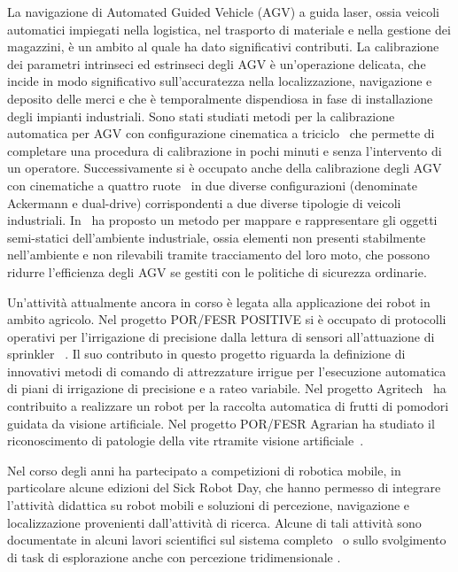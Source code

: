 \documentclass[11pt]{article}
\begin{document}
\begin{itemize}
La navigazione di Automated Guided Vehicle (AGV) a guida laser, ossia veicoli automatici impiegati nella logistica, nel trasporto di materiale
e nella gestione dei magazzini, \`e un ambito al quale ha dato significativi contributi. 
La calibrazione dei parametri intrinseci ed estrinseci degli AGV \`e un'operazione delicata, che incide in modo significativo sull'accuratezza nella localizzazione,  navigazione e deposito delle merci e che \`e temporalmente dispendiosa in fase di installazione degli impianti industriali. 
Sono stati studiati metodi per la calibrazione automatica per AGV con configurazione cinematica a triciclo~\cite{kallasi2017ras}
che permette di completare una procedura di calibrazione in pochi minuti e senza l'intervento di un operatore. 
Successivamente si \`e occupato anche della calibrazione degli AGV con cinematiche a quattro ruote~\cite{galasso2019rcim} in due diverse configurazioni (denominate Ackermann e dual-drive) corrispondenti a due diverse tipologie di veicoli industriali. 
In~\cite{lodirizzini2007icinco} ha proposto un metodo per mappare e rappresentare gli oggetti semi-statici dell'ambiente industriale, ossia elementi non presenti stabilmente 
nell'ambiente e non rilevabili tramite tracciamento del loro moto, che possono ridurre l'efficienza degli AGV se gestiti con le politiche di sicurezza ordinarie. 

Un'attivit\`a attualmente ancora in corso \`e legata alla applicazione dei robot in ambito agricolo.
Nel progetto POR/FESR POSITIVE si \`e occupato di protocolli operativi per l'irrigazione di precisione dalla lettura di sensori all'attuazione di sprinkler ~\cite{amoretti2020smartsys, penzotti2023compag}. 
Il suo contributo in questo progetto riguarda la definizione di innovativi metodi di comando di attrezzature irrigue per l'esecuzione automatica di piani di irrigazione di precisione e a rateo variabile. 
Nel progetto Agritech~\cite{monica2024etfa, saccuti2025irc} ha contribuito a realizzare un robot per la raccolta automatica di frutti di pomodori guidata da visione artificiale.
Nel progetto POR/FESR Agrarian ha studiato il riconoscimento di patologie della vite rtramite visione artificiale~\cite{saccuti2025data}.

Nel corso degli anni ha partecipato a competizioni di robotica mobile, in particolare alcune edizioni del Sick Robot Day, che hanno permesso di integrare l'attivit\`a didattica su robot mobili e soluzioni di percezione, navigazione e localizzazione provenienti dall'attivit\`a di ricerca. 
Alcune di tali attivit\`a sono documentate in alcuni lavori scientifici sul sistema completo~\cite{cigolini2014jamris} o sullo svolgimento di task di esplorazione anche con percezione tridimensionale \cite{valeriani2013acra}. 


\end{itemize}
\end{document}
